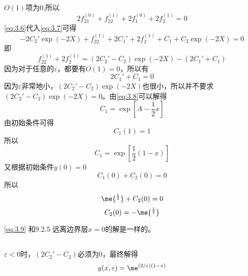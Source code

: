 \documentclass[12pt]{article}
\begin{document}
\subsection{}
$O(1)$项为$0$,所以
\begin{equation}
	2f^{(0)}_{21} + f^{(1)}_{22} + 2f^{(0)}_1 + 2f^{(1)}_2 = 0
	\label{eq:3.7}
\end{equation}
\cref{eq:3.6}代入\cref{eq:3.7}可得
\begin{equation}
	-2C_2'\exp{(-2X)} + f^{(1)}_{22} + 2C_1' + 2f^{(1)}_2 + C_1 + C_2 \exp{(-2X)}= 0
\end{equation}
即
\begin{equation}
	f^{(1)}_{22} + 2f^{(1)}_2 = (2C_2' - C_2)\exp{(-2X)} - (2C_1' + C_1)
\end{equation}
因为对于任意的$\varepsilon$，都要有$O(1)=0$，所以有
\begin{equation}
	2C_1' + C_1 = 0
	\label{eq:3.8}
\end{equation}
因为$\varepsilon$非常地小，$(2C_2' - C_2)\exp{(-2X)}$也很小，所以并不要求$(2C_2' - C_2)\exp{(-2X)} = 0$。由\cref{eq:3.8}可以解得
\begin{equation}
	C_1 = \exp{\left[A - \frac{1}{2}x\right]}
	\label{eq:3.9}
\end{equation}
由初始条件可得
\begin{equation}
	C_1(1) = 1
\end{equation}
所以
\begin{equation}
	C_1 = \exp{\left[\frac{1}{2}(1 - x)\right]}
\end{equation}
又根据初始条件$y(0) = 0$
\begin{equation}
	C_1(0) + C_2(0) = 0
\end{equation}
所以
\begin{equation}
	\me{^\frac{1}{2}} + C_2(0) = 0
\end{equation}
\begin{equation}
	C_2(0) = - \me{^\frac{1}{2}} 
\end{equation}

\cref{eq:3.9} 和9.2.5 远离边界层$x=0$的解是一样的。 

\subsection{}
$\varepsilon < 0$时，$(2C_2' - C_2)$必须为0，最终解得
\begin{equation}
	y(x,\varepsilon) = \me^{(2/\varepsilon)(1-x)}
\end{equation}






\nocite{*}


\end{document}
